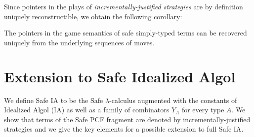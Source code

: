 Since pointers in the plays of \emph{incrementally-justified
strategies} are by definition uniquely reconstructible, we obtain
the following corollary:

\begin{cor}
\label{cor:safeptrrecover} The pointers in the game semantics of
safe simply-typed terms can be recovered uniquely from the
underlying sequences of moves.
\end{cor}

\section{Extension to Safe Idealized Algol}

We define Safe \textsf{IA} to be the Safe $\lambda$-calculus
augmented with the constants of Idealized Algol (\textsf{IA})
\cite{Reynolds81} as well as a family of combinators $Y_A$ for every
type $A$. We show that terms of the Safe \textsf{PCF}
\cite{DBLP:journals/tcs/Plotkin77} fragment are denoted by
incrementally-justified strategies and we give the key elements for
a possible extension to full Safe \textsf{IA}.





